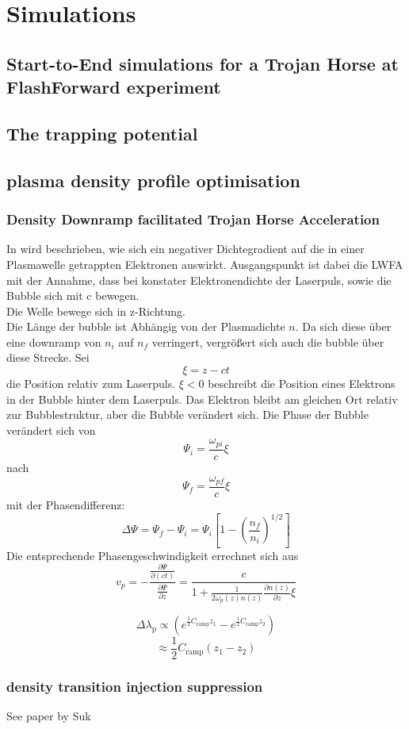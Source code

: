 \chapter{Simulations}
\section{Start-to-End simulations for a Trojan Horse at FlashForward experiment}
\section{The trapping potential}
\section{plasma density profile optimisation}
\subsection{Density Downramp facilitated Trojan Horse Acceleration}

In %
 wird beschrieben, wie sich ein negativer Dichtegradient auf die in einer Plasmawelle getrappten Elektronen auswirkt.
Ausgangspunkt ist dabei die LWFA mit der Annahme, dass bei konstater Elektronendichte der Laserpuls, sowie die Bubble sich mit c bewegen.\\
Die Welle bewege sich in z-Richtung.\\
Die L\"ange der bubble ist Abh\"angig von der Plasmadichte $n$. Da sich diese \"uber eine downramp von $n_i$ auf $n_f$ verringert, vergr\"o\ss ert sich auch die bubble \"uber diese Strecke.
Sei $$\xi=z-ct$$ die Position relativ zum Laserpuls. $\xi<0$ beschreibt die Position eines Elektrons in der Bubble hinter dem Laserpuls.
Das Elektron bleibt am gleichen Ort relativ zur Bubblestruktur, aber die Bubble ver\"andert sich. Die Phase der Bubble ver\"andert sich von 
$$\Psi_i=\frac{\omega_{pi}}{c}\xi$$ nach
$$\Psi_f=\frac{\omega_{pf}}{c}\xi$$
mit der Phasendifferenz:
$$\Delta\Psi=\Psi_f-\Psi_i=\Psi_i[1-(\frac{n_f}{n_i})^{1/2}]$$
Die entsprechende Phasengeschwindigkeit errechnet sich aus 
$$v_p=-\frac{\frac{\partial \Psi}{\partial(ct)}}{\frac{\partial \Psi}{\partial z}}=\frac{c}{1+\frac{1}{2\omega_p(z)n(z)}\frac{\partial n(z)}{\partial z}\xi }$$

$$\Delta \lambda_\mathrm{p} \propto (e^{\frac{1}{2}C_\mathrm{ramp}z_1}-e^{\frac{1}{2}C_\mathrm{ramp}z_2}) $$
$$\approx \frac{1}{2}C_\mathrm{ramp}(z_1-z_2)  $$
\subsection{density transition injection suppression}
See paper by Suk

